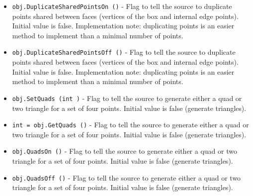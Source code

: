 \begin{itemize}
\item  \verb|obj.DuplicateSharedPointsOn ()| -  Flag to tell the source to duplicate points shared between faces
 (vertices of the box and internal edge points). Initial value is false.
 Implementation note: duplicating points is an easier method to implement
 than a minimal number of points.

\item  \verb|obj.DuplicateSharedPointsOff ()| -  Flag to tell the source to duplicate points shared between faces
 (vertices of the box and internal edge points). Initial value is false.
 Implementation note: duplicating points is an easier method to implement
 than a minimal number of points.

\item  \verb|obj.SetQuads (int )| -  Flag to tell the source to generate either a quad or two triangle for a
 set of four points. Initial value is false (generate triangles).

\item  \verb|int = obj.GetQuads ()| -  Flag to tell the source to generate either a quad or two triangle for a
 set of four points. Initial value is false (generate triangles).

\item  \verb|obj.QuadsOn ()| -  Flag to tell the source to generate either a quad or two triangle for a
 set of four points. Initial value is false (generate triangles).

\item  \verb|obj.QuadsOff ()| -  Flag to tell the source to generate either a quad or two triangle for a
 set of four points. Initial value is false (generate triangles).

\end{itemize}

